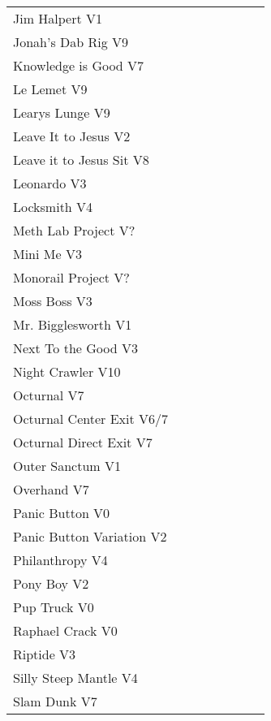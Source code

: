 \begin{center}
\begin{supertabular}{p{0.65\linewidth}r}
Jim Halpert V1 & \pageref{rt:Jim Halpert} \\
Jonah's Dab Rig V9 & \pageref{rt:Jonah's Dab Rig} \\
Knowledge is Good V7 & \pageref{rt:Knowledge is Good} \\
Le Lemet V9 & \pageref{rt:Le Lemet} \\
Learys Lunge V9 & \pageref{rt:Learys Lunge} \\
Leave It to Jesus V2 & \pageref{rt:Leave It to Jesus} \\
Leave it to Jesus Sit V8 & \pageref{vr:Leave it to Jesus Sit} \\
Leonardo V3 & \pageref{rt:Leonardo} \\
Locksmith V4 & \pageref{rt:Locksmith} \\
Meth Lab Project V? & \pageref{rt:Meth Lab Project} \\
Mini Me V3 & \pageref{rt:Mini Me} \\
Monorail Project V? & \pageref{rt:Monorail Project} \\
Moss Boss V3 & \pageref{rt:Moss Boss} \\
Mr. Bigglesworth V1 & \pageref{vr:Mr. Bigglesworth} \\
Next To the Good V3 & \pageref{rt:Next To the Good} \\
Night Crawler V10 & \pageref{rt:Night Crawler} \\
Octurnal V7 & \pageref{rt:Octurnal} \\
Octurnal Center Exit V6/7 & \pageref{vr:Octurnal Center Exit} \\
Octurnal Direct Exit V7 & \pageref{vr:Octurnal Direct Exit} \\
Outer Sanctum V1 & \pageref{rt:Outer Sanctum} \\
Overhand V7 & \pageref{rt:Overhand} \\
Panic Button V0 & \pageref{rt:Panic Button} \\
Panic Button Variation V2 & \pageref{vr:Panic Button Variation} \\
Philanthropy V4 & \pageref{rt:Philanthropy} \\
Pony Boy V2 & \pageref{rt:Pony Boy} \\
Pup Truck V0 & \pageref{rt:Pup Truck} \\
Raphael Crack V0 & \pageref{rt:Raphael Crack} \\
Riptide V3 & \pageref{rt:Riptide} \\
Silly Steep Mantle V4 & \pageref{rt:Silly Steep Mantle} \\
Slam Dunk V7 & \pageref{rt:Slam Dunk} \\

\end{supertabular}
\end{center}
